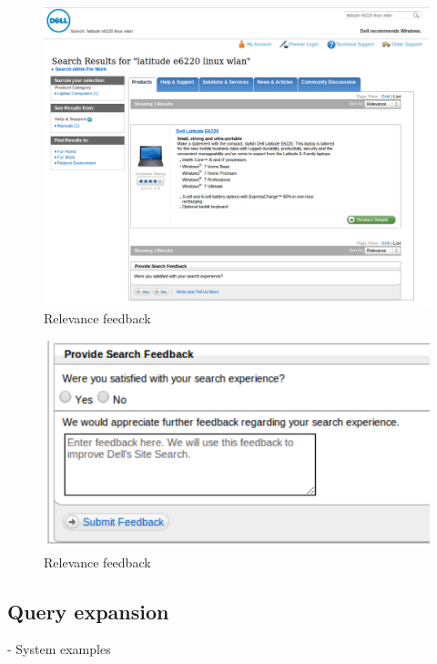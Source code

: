 \documentclass{sigchi}
\begin{document}
\begin{figure}[htp] %
\caption{Relevance feedback \protect} \label{figure_relevanceFeedback1}
\includegraphics[scale=0.28]{figures/relevanceFeedback1.pdf} 
\end{figure}

\begin{figure}[htp] %
\caption{Relevance feedback \protect} \label{figure_relevanceFeedback2}
\includegraphics[scale=0.70]{figures/relevanceFeedback2.pdf} 
\end{figure}

\subsection{Query expansion}
- System examples
\end{document}
